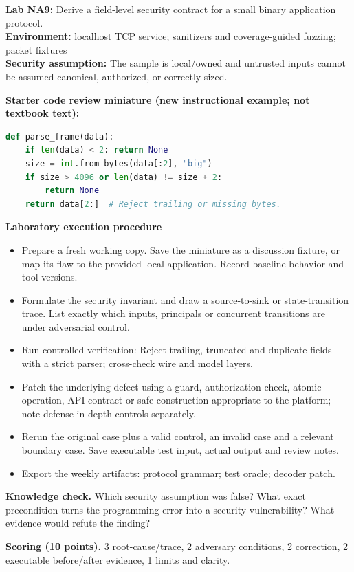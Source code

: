 \documentclass[10pt,letterpaper]{article}
\begin{document}
\begin{insight}\textbf{Lab NA9:} Derive a field-level security contract for a small binary application protocol.\\\textbf{Environment:} localhost TCP service; sanitizers and coverage-guided fuzzing; packet fixtures\\\textbf{Security assumption:} The sample is local/owned and untrusted inputs cannot be assumed canonical, authorized, or correctly sized.\end{insight}
\textbf{Starter code review miniature (new instructional example; not textbook text):}
\begin{lstlisting}[language=Python]
def parse_frame(data):
    if len(data) < 2: return None
    size = int.from_bytes(data[:2], "big")
    if size > 4096 or len(data) != size + 2:
        return None
    return data[2:]  # Reject trailing or missing bytes.
\end{lstlisting}
\textbf{Laboratory execution procedure}
\begin{itemize}[leftmargin=*,itemsep=2pt]
\item Prepare a fresh working copy. Save the miniature as a discussion fixture, or map its flaw to the provided local application. Record baseline behavior and tool versions.
\item Formulate the security invariant and draw a source-to-sink or state-transition trace. List exactly which inputs, principals or concurrent transitions are under adversarial control.
\item Run controlled verification: Reject trailing, truncated and duplicate fields with a strict parser; cross-check wire and model layers.
\item Patch the underlying defect using a guard, authorization check, atomic operation, API contract or safe construction appropriate to the platform; note defense-in-depth controls separately.
\item Rerun the original case plus a valid control, an invalid case and a relevant boundary case. Save executable test input, actual output and review notes.
\item Export the weekly artifacts: protocol grammar; test oracle; decoder patch.
\end{itemize}
\textbf{Knowledge check.} Which security assumption was false? What exact precondition turns the programming error into a security vulnerability? What evidence would refute the finding?

\textbf{Scoring (10 points).} 3 root-cause/trace, 2 adversary conditions, 2 correction, 2 executable before/after evidence, 1 limits and clarity.
\end{document}
